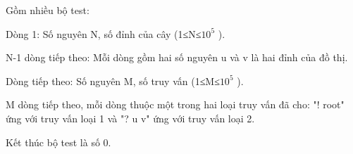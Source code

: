 Gồm nhiều bộ test:  

   Dòng 1: Số nguyên N, số đỉnh của cây (1≤N≤$10^{5}$   ).  

   N-1 dòng tiếp theo: Mỗi dòng gồm hai số nguyên u và v là hai đỉnh của đồ thị.  

   Dòng tiếp theo: Số nguyên M, số truy vấn (1≤M≤$10^{5}$   ).  

   M dòng tiếp theo, mỗi dòng thuộc một trong hai loại truy vấn đã cho: "! root" ứng với truy vấn loại 1 và "? u v" ứng với truy vấn loại 2.  

   Kết thúc bộ test là số 0.